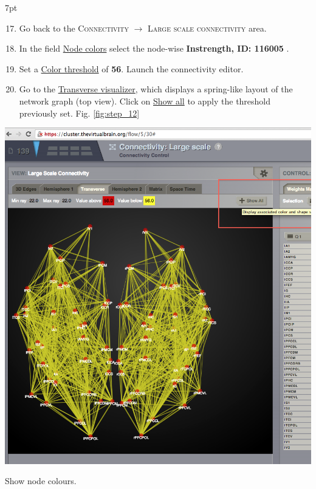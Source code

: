 \documentclass{tufte-handout}
\newenvironment{formal}{%
  \def\FrameCommand{%
    \hspace{1pt}%
    {\color{DarkBlue}\vrule width 2pt}%
    {\color{formalshade}\vrule width 4pt}%
    \colorbox{formalshade}%
  }%
  \MakeFramed{\advance\hsize-\width\FrameRestore}%
  \noindent\hspace{-4.55pt}%
  \begin{adjustwidth}{}{7pt}%
  \vspace{2pt}\vspace{2pt}%
}
{%
  \vspace{2pt}\end{adjustwidth}\endMakeFramed%
}
\begin{document}
\begin{formal}
  \begin{enumerate}[resume] %
  \setcounter{enumi}{16}
  \item Go back to the \textsc{Connectivity} $\rightarrow$ \textsc{Large scale connectivity} area. 
  \item  In the field \underline{Node colors} select
the node-wise \textbf{Instrength, ID: 116005} .
\item Set a \underline{Color threshold} of \textbf{56}. Launch the connectivity editor.
  \item Go to the \underline{Transverse visualizer}, which displays a spring-like layout of the network graph (top view). Click on \underline{Show all} to apply the threshold previously set. Fig. \ref{fig:step_12}
  \end{enumerate}
\end{formal}

\begin{marginfigure}
  \includegraphics[width=0.9\linewidth]{Handout_UI_ModellingStructuralLesions_ShowColourNodes}%
  \caption{Show node colours.}%
  \label{fig:step_12}%
\end{marginfigure}
\end{document}
